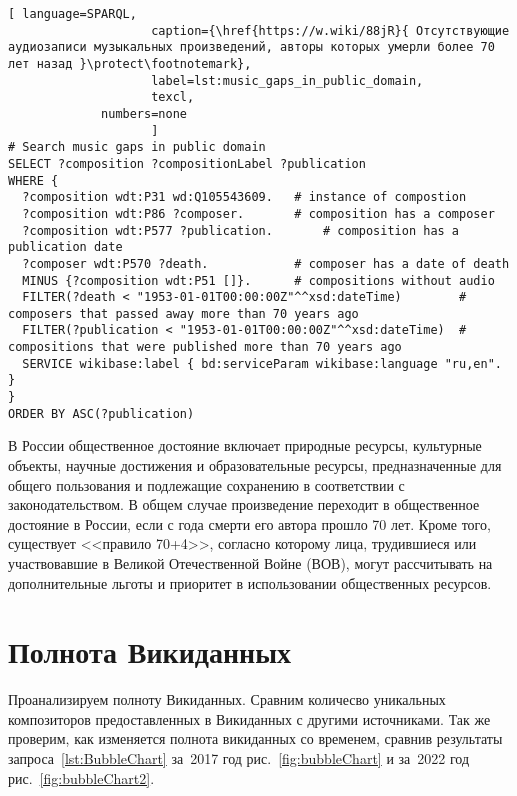 \begin{lstlisting}[ language=SPARQL,
                    caption={\href{https://w.wiki/88jR}{ Отсутствующие аудиозаписи музыкальных произведений, авторы которых умерли более 70 лет назад }\protect\footnotemark},
                    label=lst:music_gaps_in_public_domain,
                    texcl,
	         numbers=none
                    ]
# Search music gaps in public domain
SELECT ?composition ?compositionLabel ?publication
WHERE {
  ?composition wdt:P31 wd:Q105543609.	# instance of compostion
  ?composition wdt:P86 ?composer.		# composition has a composer
  ?composition wdt:P577 ?publication.		# composition has a publication date
  ?composer wdt:P570 ?death.			# composer has a date of death
  MINUS {?composition wdt:P51 []}.		# compositions without audio 
  FILTER(?death < "1953-01-01T00:00:00Z"^^xsd:dateTime)        # composers that passed away more than 70 years ago
  FILTER(?publication < "1953-01-01T00:00:00Z"^^xsd:dateTime)  # compositions that were published more than 70 years ago
  SERVICE wikibase:label { bd:serviceParam wikibase:language "ru,en". }
}
ORDER BY ASC(?publication)
\end{lstlisting}%

В России общественное достояние включает природные ресурсы, культурные объекты, научные достижения и образовательные ресурсы, предназначенные для общего пользования и подлежащие сохранению в соответствии с законодательством. В общем случае произведение переходит в общественное достояние в России, если с года смерти его автора прошло 70 лет. Кроме того, существует <<правило 70+4>>, согласно которому лица, трудившиеся или участвовавшие в Великой Отечественной Войне (ВОВ), могут рассчитывать на дополнительные льготы и приоритет в использовании общественных ресурсов.

\section{Полнота Викиданных}
Проанализируем полноту Викиданных. Сравним количесво уникальных композиторов предоставленных в Викиданных с другими источниками. Так же проверим, как изменяется полнота викиданных со временем, сравнив результаты запроса~\ref{lst:BubbleChart} за~2017 год рис.~\ref{fig:bubbleChart} и за~2022 год рис.~\ref{fig:bubbleChart2}.

